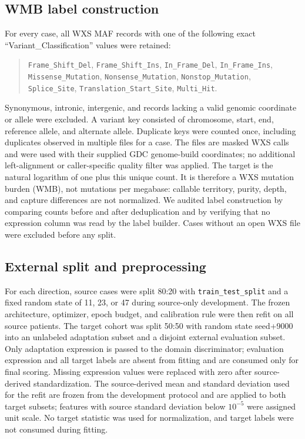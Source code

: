 \documentclass[11pt]{article}
\begin{document}
\subsection{WMB label construction}
\sloppy
For every case, all WXS MAF records with one of the following exact ``Variant\_Classification'' values were retained:
\begin{quote}\footnotesize\raggedright\texttt{Frame\_Shift\_Del}, \texttt{Frame\_Shift\_Ins}, \texttt{In\_Frame\_Del}, \texttt{In\_Frame\_Ins}, \texttt{Missense\_Mutation}, \texttt{Nonsense\_Mutation}, \texttt{Nonstop\_Mutation}, \texttt{Splice\_Site}, \texttt{Translation\_Start\_Site}, \texttt{Multi\_Hit}.\end{quote}
\noindent Synonymous, intronic, intergenic, and records lacking a valid genomic coordinate or allele were excluded. A variant key consisted of chromosome, start, end, reference allele, and alternate allele. Duplicate keys were counted once, including duplicates observed in multiple files for a case. The files are masked WXS calls and were used with their supplied GDC genome-build coordinates; no additional left-alignment or caller-specific quality filter was applied. The target is the natural logarithm of one plus this unique count. It is therefore a WXS mutation burden (WMB), not mutations per megabase: callable territory, purity, depth, and capture differences are not normalized. We audited label construction by comparing counts before and after deduplication and by verifying that no expression column was read by the label builder. Cases without an open WXS file were excluded before any split.
\fussy

\subsection{External split and preprocessing}
For each direction, source cases were split 80:20 with \texttt{train\_test\_split} and a fixed random state of 11, 23, or 47 during source-only development. The frozen architecture, optimizer, epoch budget, and calibration rule were then refit on all source patients. The target cohort was split 50:50 with random state seed+9000 into an unlabeled adaptation subset and a disjoint external evaluation subset. Only adaptation expression is passed to the domain discriminator; evaluation expression and all target labels are absent from fitting and are consumed only for final scoring. Missing expression values were replaced with zero after source-derived standardization. The source-derived mean and standard deviation used for the refit are frozen from the development protocol and are applied to both target subsets; features with source standard deviation below $10^{-5}$ were assigned unit scale. No target statistic was used for normalization, and target labels were not consumed during fitting.
\end{document}
